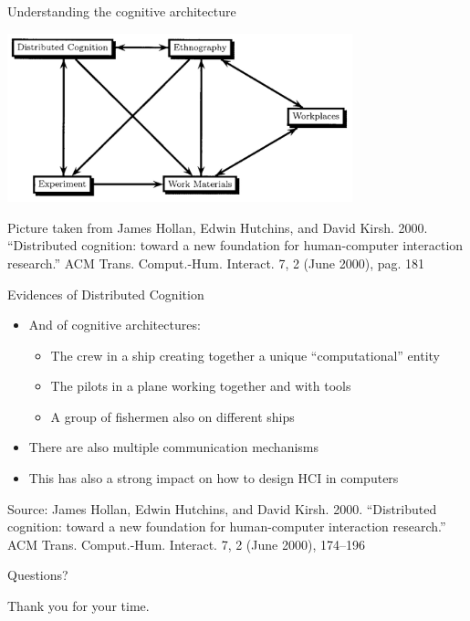 \documentclass{beamer}
\begin{document}
\begin{frame}
{\centerline{Understanding the cognitive architecture}}

\begin{center}
 \includegraphics[width=10cm]{P2023.AIBCCSS.ExtendedMindDistributedCognitionSystemicThinking/networkDistributedCognition.jpg}
 
 \end{center}

\begin{center}
 \tiny{Picture taken from James Hollan, Edwin Hutchins, and David Kirsh. 2000. ``Distributed cognition: toward a new foundation for human-computer interaction research.'' ACM Trans. Comput.-Hum. Interact. 7, 2 (June 2000), pag. 181}
 \end{center}

\end{frame}


\begin{frame}
{\centerline{Evidences of Distributed Cognition}}

\begin{itemize}
\item And of cognitive architectures:
\begin{itemize}
\item The crew in a ship creating together a unique ``computational'' entity
\item The pilots in a plane working together and with tools
\item A group of fishermen also on different ships
\end{itemize}
\item There are also multiple communication mechanisms
\item This has also a strong impact on how to design HCI in computers
\end{itemize}
\begin{center}
    \tiny{Source: James Hollan, Edwin Hutchins, and David Kirsh. 2000. ``Distributed cognition: toward a new foundation for human-computer interaction research.'' ACM Trans. Comput.-Hum. Interact. 7, 2 (June 2000), 174–196}
\end{center}

\end{frame}



\begin{frame}
{\centerline{Questions?}}
\vspace{1cm}
\begin{center}
    \LARGE{Thank you for your time.}
\end{center}

\end{frame}
\end{document}
